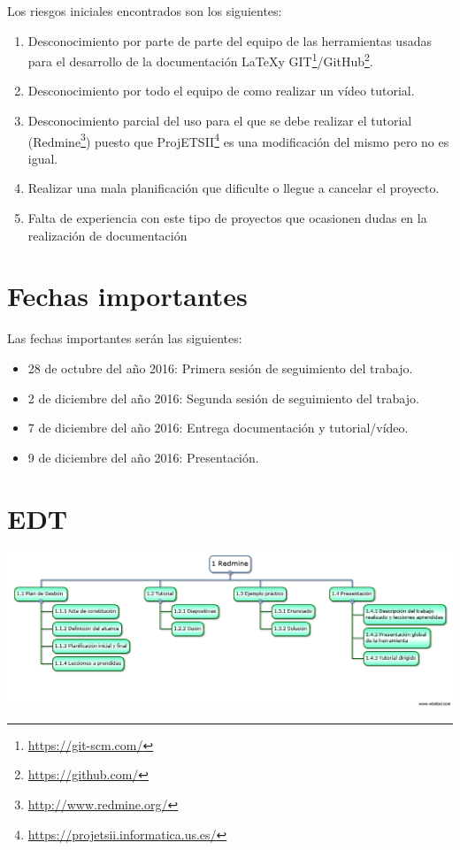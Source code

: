 \documentclass[a4paper,10pt]{scrartcl}
\begin{document}
Los riesgos iniciales encontrados son los siguientes:
\begin{enumerate}
	\item Desconocimiento por parte de parte del equipo de las herramientas usadas para el desarrollo de la documentación \LaTeX y GIT\footnote{\url{https://git-scm.com/}}/GitHub\footnote{\url{https://github.com/}}.
	
	\item Desconocimiento por todo el equipo de como realizar un vídeo tutorial.
	
	\item Desconocimiento parcial del uso para el que se debe realizar el tutorial (Redmine\footnote{\url{http://www.redmine.org/}}) puesto que ProjETSII\footnote{\url{https://projetsii.informatica.us.es/}} es una modificación del mismo pero no es igual.
	
	\item Realizar una mala planificación que dificulte o llegue a cancelar el proyecto.
	
	\item Falta de experiencia con este tipo de proyectos que ocasionen dudas en la realización de documentación 
\end{enumerate}


\section{Fechas importantes}
Las fechas importantes serán las siguientes:

	\begin{itemize}
		\item 28 de octubre del año 2016: Primera sesión de seguimiento del trabajo.
		
		\item 2 de diciembre del año 2016: Segunda sesión de seguimiento del trabajo.
		
		\item 7 de diciembre del año 2016: Entrega documentación y tutorial/vídeo.
		
		\item 9 de diciembre del año 2016: Presentación.
	\end{itemize}

\section{EDT}

	\begin{center}
		\includegraphics[width=\linewidth]{EDT}
	\end{center}
\end{document}
